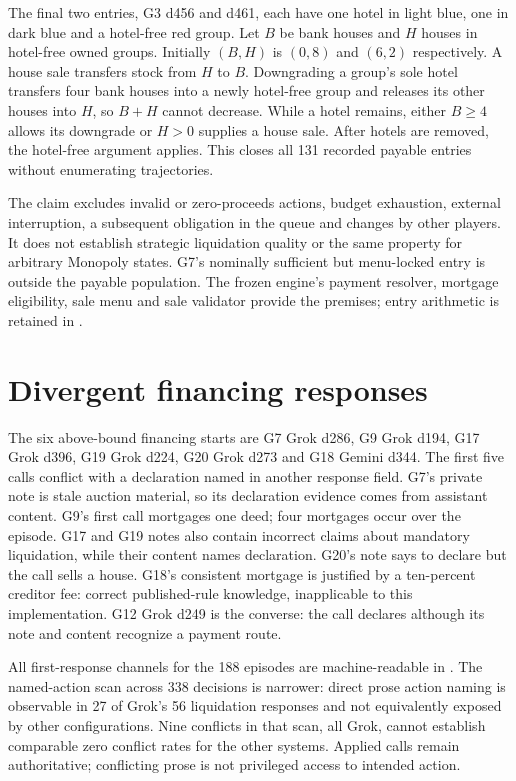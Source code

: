 The final two entries, G3 d456 and d461, each have one hotel in light blue, one in dark blue and a hotel-free red group. Let $B$ be bank houses and $H$ houses in hotel-free owned groups. Initially $(B,H)$ is $(0,8)$ and $(6,2)$ respectively. A house sale transfers stock from $H$ to $B$. Downgrading a group's sole hotel transfers four bank houses into a newly hotel-free group and releases its other houses into $H$, so $B+H$ cannot decrease. While a hotel remains, either $B\geq4$ allows its downgrade or $H>0$ supplies a house sale. After hotels are removed, the hotel-free argument applies. This closes all 131 recorded payable entries without enumerating trajectories.

The claim excludes invalid or zero-proceeds actions, budget exhaustion, external interruption, a subsequent obligation in the queue and changes by other players. It does not establish strategic liquidation quality or the same property for arbitrary Monopoly states. G7's nominally sufficient but menu-locked entry is outside the payable population. The frozen engine's payment resolver, mortgage eligibility, sale menu and sale validator provide the premises; entry arithmetic is retained in .

\section{Divergent financing responses}
\label{app:divergences}
The six above-bound financing starts are G7 Grok d286, G9 Grok d194, G17 Grok d396, G19 Grok d224, G20 Grok d273 and G18 Gemini d344. The first five calls conflict with a declaration named in another response field. G7's private note is stale auction material, so its declaration evidence comes from assistant content. G9's first call mortgages one deed; four mortgages occur over the episode. G17 and G19 notes also contain incorrect claims about mandatory liquidation, while their content names declaration. G20's note says to declare but the call sells a house. G18's consistent mortgage is justified by a ten-percent creditor fee: correct published-rule knowledge, inapplicable to this implementation. G12 Grok d249 is the converse: the call declares although its note and content recognize a payment route.

All first-response channels for the 188 episodes are machine-readable in . The named-action scan across 338 decisions is narrower: direct prose action naming is observable in 27 of Grok's 56 liquidation responses and not equivalently exposed by other configurations. Nine conflicts in that scan, all Grok, cannot establish comparable zero conflict rates for the other systems. Applied calls remain authoritative; conflicting prose is not privileged access to intended action.

